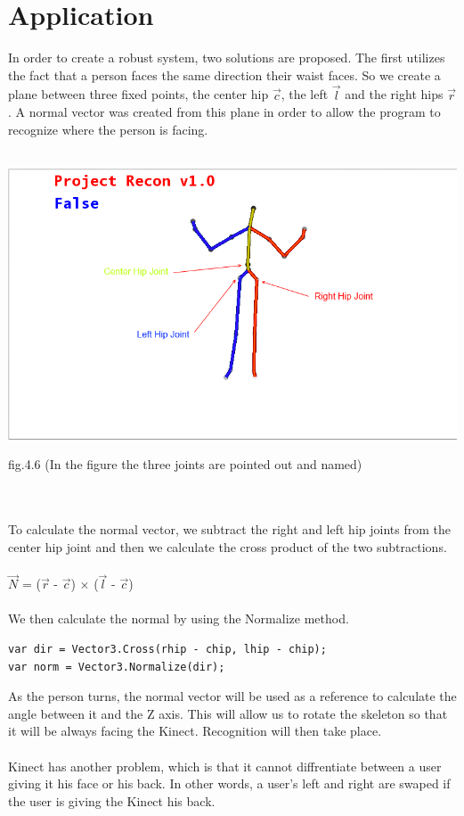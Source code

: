 \chapter{Application}\label{chap:application}
In order to create a robust system, two solutions are proposed. The first utilizes the fact that a person faces 
the same direction their waist faces. So we create a plane between three fixed 
points, the center hip $\vec{c}$, the left $\vec{l}$ and the right hips $\vec{r}$. A normal vector \N was created 
from this plane in order to allow the program to recognize where the person is 
facing. 
\\
\\
\centerline{\includegraphics[scale=0.5]{images/skeleton_frame3.png}}
\centerline{fig.4.6 (In the figure the three joints are pointed out and named)}
\\
\\
To calculate the normal vector, we subtract the right and left hip joints from 
the center hip joint and then we calculate the cross product of the two 
subtractions.
\\
\\
$\vec{N}$ = ($\vec{r}$ - $\vec{c}$) $\times$ ($\vec{l}$ - $\vec{c}$)
\\
\\
We then calculate the normal by using the Normalize method.
\begin{verbatim}
var dir = Vector3.Cross(rhip - chip, lhip - chip);
var norm = Vector3.Normalize(dir);
\end{verbatim}
As the person turns, the normal vector will be used as a reference to calculate the angle between it and the Z axis. This will allow us to rotate the skeleton so that it will be always facing the Kinect. Recognition will then take place.
\\
\\
Kinect has another problem, which is that it cannot diffrentiate between a user giving it his face or his back. In other words, a user's left and right are swaped if the user is giving the Kinect his back.

